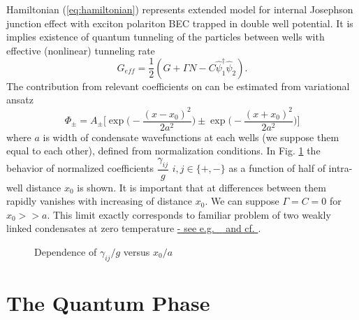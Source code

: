 \documentclass[aps, pre, preprint, groupedaddress, superscriptaddress, showkeys, showpacs] {revtex4-1}
\begin{document}
Hamiltonian (\ref{eq:hamiltonian}) represents extended model for internal Josephson junction effect with exciton polariton BEC trapped in double well potential.
It is implies existence of quantum tunneling of the particles between wells with effective (nonlinear) tunneling rate
%
\begin{equation}
G_{eff} = \dfrac{1}{2}(G+\Gamma N - C\hat{\psi}_1^\dag\hat{\psi}_2).
\label{eq:tunneling_rate}
\end{equation}
%
The contribution from relevant coefficients on can be estimated from variational ansatz
%
\begin{equation}
\Phi_{\pm} = A_{\pm} \Big[ \exp \Big( -\dfrac{(x - x_0)^2}{2 a^2} \Big) \pm \exp \Big( -\dfrac{(x + x_0)^2}{2 a^2} \Big) \Big]
\label{eq:two_modes_eq}
\end{equation}
%
where $a$ is width of condensate wavefunctions at each wells (we suppose them equal to each other), defined from normalization conditions.
In Fig. \ref{pic:gamma_pm_vs_g} the behavior of normalized coefficients $\dfrac{\gamma_{ij}}{g}$ $i,j \in \{+,-\}$ as a function of half of intra-well distance $x_0$ is shown.
It is important that at differences between them rapidly vanishes with increasing of distance $x_0$.
We can suppose $\Gamma = C = 0$ for $x_0 >> a$.
This limit exactly corresponds to familiar problem of two weakly linked condensates at zero temperature \underline{- see e.g. ~\cite{39} and cf. }.
%
\begin{figure}[ht]
\caption{Dependence of $\gamma_{ij} / g$ versus $x_0 / a$ \label{pic:gamma_pm_vs_g}}
\end{figure}
%

\section{The Quantum Phase \label{sec:quantum_phase}}
\end{document}
